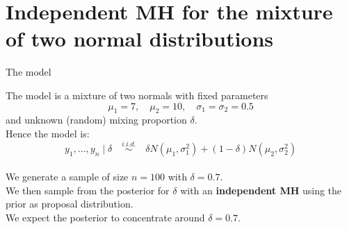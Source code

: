 %
%
%
%
%
%
%
%
%


\section{Independent MH for the mixture of two normal distributions}


\begin{frame}{The model}

The model is a mixture of two normals with fixed parameters\\
$$\mu_1=7, \quad \mu_2=10, \quad \sigma_1=\sigma_2=0.5$$
and unknown (random) mixing proportion $\delta$.\\
\vspace{.1in}
Hence the model is:
$$ y_1, \ldots, y_n \mid \delta \quad \overset{i.i.d.}{\sim} \quad \delta N(\mu_1,\sigma_1^2) + (1-\delta) N(\mu_2,\sigma_2^2)$$\\
\vspace{0.2in}
We generate a sample of size $n=100$ with $\delta=0.7$.\\
\vspace{0.1in}
We then sample from the posterior for $\delta$ with an \textbf{independent MH} using the prior as proposal distribution.\\
\vspace{0.1in}
We expect the posterior to concentrate around $\delta=0.7$.
 
\end{frame}


